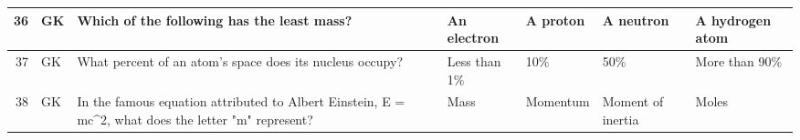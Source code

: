 \documentclass[10pt]{article}
\begin{document}
\begin{tiny}
\begin{longtable}{r|p{0.375in}|p{1.275in}|p{0.75in}|p{0.75in}|p{0.75in}|p{0.75in}}
    36    &      GK &                                                                                                                                                                                                                                       Which of the following has the least mass? &                                                                                                                           An electron &                                                                                              A proton &                                                                                                                  A neutron &                                                                                                                   A hydrogen atom \\\hline
    37    &      GK &                                                                                                                                                                                                                         What percent of an atom's space does its nucleus occupy? &                                                                                                                          Less than 1\% &                                                                                                   10\% &                                                                                                                        50\% &                                                                                                                     More than 90\% \\\hline
    38    &      GK &                                                                                                                                                                              In the famous equation attributed to Albert Einstein, E = mc\textasciicircum 2, what does the letter "m" represent? &                                                                                                                                  Mass &                                                                                              Momentum &                                                                                                          Moment of inertia &                                                                                                                             Moles \\\hline

\end{longtable}
\end{tiny}
\end{document}
